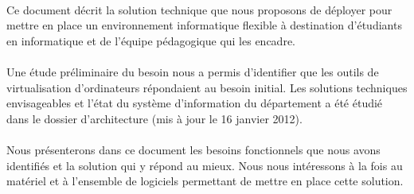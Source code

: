 \paragraph{} Ce document décrit la solution technique que nous proposons de
déployer pour mettre en place un environnement informatique flexible à
destination d'étudiants en informatique et de l'équipe pédagogique qui les
encadre.

\paragraph{} Une étude préliminaire du besoin nous a permis d'identifier que les
outils de virtualisation d'ordinateurs répondaient au besoin initial. Les
solutions techniques envisageables et l'état du système d'information du
département a été étudié dans le dossier d'architecture (mis à jour le 16
janvier 2012).

\paragraph{} Nous présenterons dans ce document les besoins fonctionnels que
nous avons identifiés et la solution qui y répond au mieux. Nous nous
intéressons à la fois au matériel et à l'ensemble de logiciels permettant de
mettre en place cette solution.
